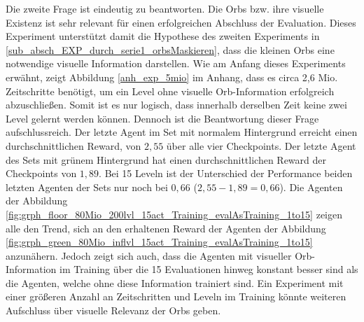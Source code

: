 Die zweite Frage ist eindeutig zu beantworten. Die Orbs bzw. ihre visuelle Existenz ist sehr relevant für einen erfolgreichen Abschluss der Evaluation. Dieses Experiment unterstützt damit die Hypothese des zweiten Experiments in \ref{sub_absch_EXP_durch_serie1_orbsMaskieren}, dass die kleinen Orbs eine notwendige visuelle Information darstellen. Wie am Anfang dieses Experiments erwähnt, zeigt Abbildung \ref{anh_exp_5mio} im Anhang, dass es circa 2,6 Mio. Zeitschritte benötigt, um ein Level ohne visuelle Orb-Information erfolgreich abzuschließen. Somit ist es nur logisch, dass innerhalb derselben Zeit keine zwei Level gelernt werden können. Dennoch ist die Beantwortung dieser Frage aufschlussreich. Der letzte Agent im Set mit normalem Hintergrund erreicht einen durchschnittlichen Reward, von $2,55$ über alle vier Checkpoints. Der letzte Agent des Sets mit grünem Hintergrund hat einen durchschnittlichen Reward der Checkpoints von $1,89$. Bei 15 Leveln ist der Unterschied der Performance beiden letzten Agenten der Sets nur noch bei $0,66$ ($2,55-1,89=0,66$). Die Agenten der Abbildung \ref{fig:grph_floor_80Mio_200lvl_15act_Training_evalAsTraining_1to15} zeigen alle den Trend, sich an den erhaltenen Reward der Agenten der Abbildung \ref{fig:grph_green_80Mio_inflvl_15act_Training_evalAsTraining_1to15} anzunähern. Jedoch zeigt sich auch, dass die Agenten mit visueller Orb-Information im Training über die 15 Evaluationen hinweg konstant besser sind als die Agenten, welche ohne diese Information trainiert sind. Ein Experiment mit einer größeren Anzahl an Zeitschritten und Leveln im Training könnte weiteren Aufschluss über visuelle Relevanz der Orbs geben.

